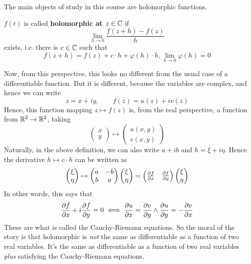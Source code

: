 \documentclass{article}
\begin{document}
The main objects of study in this course are holomorphic functions.
\begin{definition}
\(f(t)\) is called \textbf{holomorphic at \(z \in \mathbb{C}\)} if
\begin{equation}\lim_{h \to 0}\frac{f(z + h) - f(z)}{h}\end{equation}
exists, i.e. there is \(c \in \mathbb{C}\) such that
\begin{equation}f(z + h) = f(z) + c \cdot h + \varphi(h) \cdot h, \lim_{h \to 0}\varphi(h) = 0\end{equation}
\end{definition}
Now, from this perspective, this looks no different from the usual case of a differentiable function. But it is different, because the variables are complex, and hence we can write
\begin{equation}z = x + iy, \qquad f(z) = u(z) + iv(z)\end{equation}
Hence, this function mapping \(z \mapsto f(z)\) is, from the real perspective, a function from
\(\mathbb{R}^2 \to \mathbb{R}^2\), taking
\begin{equation}\begin{pmatrix} x \\ y \end{pmatrix} \mapsto \begin{pmatrix} u(x, y) \\ v(x, y) \end{pmatrix}\end{equation}
Naturally, in the above definition, we can also write \(a + ib\) and \(h = \xi + i\eta\). Hence the derivative \(h \mapsto c \cdot h\) can be written as
\begin{equation}\begin{pmatrix} \xi \\ \eta \end{pmatrix} \mapsto
\begin{pmatrix} a & -b \\ b & a \end{pmatrix}
  \begin{pmatrix} \xi \\ \eta \end{pmatrix}
= \begin{pmatrix}{\frac{\partial {f}}{\partial {x}}} & {\frac{\partial {f}}{\partial {y}}}\end{pmatrix}
  \begin{pmatrix} \xi \\ \eta \end{pmatrix}\end{equation}
In other words, this says that
\begin{equation}{\frac{\partial {f}}{\partial {x}}} + i{\frac{\partial {f}}{\partial {y}}} = 0
\iff {\frac{\partial {u}}{\partial {x}}} = {\frac{\partial {v}}{\partial {y}}} \land {\frac{\partial {u}}{\partial {y}}} = -{\frac{\partial {v}}{\partial {x}}}\end{equation}
These are what is called the Cauchy-Riemann equations. So the moral of the story is that holomorphic is \textit{not} the same as differentiable as a function of two real variables. It's the same as differentiable as a function of two real variables \textit{plus} satisfying the Cauchy-Riemann equations.
\end{document}
